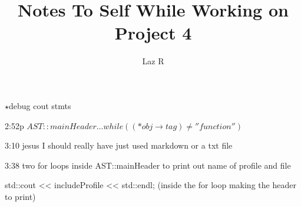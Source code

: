 \documentclass{article}
\begin{document}
    \title{Notes To Self While Working on Project 4}
    \author{Laz R}
    \maketitle

\begin{list}{$\star$}{debug cout stmts}
    \item 2:52p $ AST::mainHeader \dots while  \left( \left( \ast{obj}\rightarrow{tag} \right) \neq''function'' \right)$
    \item 3:10 jesus I should really have just used markdown or a txt file
    \item 3:38 two for loops inside AST::mainHeader to print out name of profile and file
    \item std::cout << includeProfile << std::endl; (inside the for loop making the header to print)

\end{list}
\end{document}
